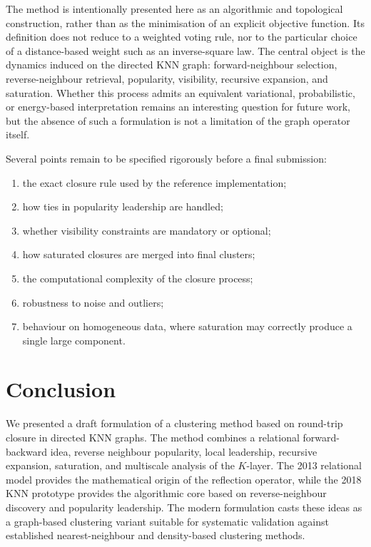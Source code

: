 \documentclass[pdflatex,sn-mathphys-num]{sn-jnl}
\begin{document}
The method is intentionally presented here as an algorithmic and topological construction, rather than as the minimisation of an explicit objective function. Its definition does not reduce to a weighted voting rule, nor to the particular choice of a distance-based weight such as an inverse-square law. The central object is the dynamics induced on the directed KNN graph: forward-neighbour selection, reverse-neighbour retrieval, popularity, visibility, recursive expansion, and saturation. Whether this process admits an equivalent variational, probabilistic, or energy-based interpretation remains an interesting question for future work, but the absence of such a formulation is not a limitation of the graph operator itself.

Several points remain to be specified rigorously before a final submission:
\begin{enumerate}
    \item the exact closure rule used by the reference implementation;
    \item how ties in popularity leadership are handled;
    \item whether visibility constraints are mandatory or optional;
    \item how saturated closures are merged into final clusters;
    \item the computational complexity of the closure process;
    \item robustness to noise and outliers;
    \item behaviour on homogeneous data, where saturation may correctly produce a single large component.
\end{enumerate}

\section{Conclusion}\label{sec:conclusion}

We presented a draft formulation of a clustering method based on round-trip closure in directed KNN graphs. The method combines a relational forward-backward idea, reverse neighbour popularity, local leadership, recursive expansion, saturation, and multiscale analysis of the $K$-layer. The 2013 relational model provides the mathematical origin of the reflection operator, while the 2018 KNN prototype provides the algorithmic core based on reverse-neighbour discovery and popularity leadership. The modern formulation casts these ideas as a graph-based clustering variant suitable for systematic validation against established nearest-neighbour and density-based clustering methods.
\end{document}
